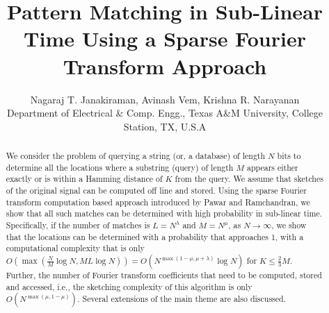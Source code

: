 \documentclass[journal,11pt,onecolumn]{IEEEtran}  %
\title{\LARGE \bf
Pattern Matching in Sub-Linear Time Using a Sparse Fourier Transform Approach
}
\author{Nagaraj T. Janakiraman, Avinash Vem, Krishna R. Narayanan \\
{Department of Electrical \& Comp. Engg., Texas A\&M University, College Station, TX, U.S.A}
}
\begin{document}
\maketitle
\thispagestyle{empty}
\pagestyle{empty}


\begin{abstract}
We consider the problem of querying a string (or, a database) of length $N$ bits to determine all the locations where a substring (query) of length $M$ appears either exactly or is within a Hamming distance of $K$ from the query. We assume that sketches of the original signal can be computed off line and stored. Using the sparse Fourier transform computation based approach introduced by Pawar and Ramchandran, we show that all such matches can be determined with high probability in sub-linear time. Specifically, if the number of matches is $L=N^\lambda$ and $M = N^\mu$, as $N \rightarrow \infty$, we show that the locations can be determined with a probability that approaches 1, with a computational complexity that is only $O\left(\max \left(\frac{N}{M} \log N, M L \log N \right) \right) = O\left(N^{\max(1-\mu,\mu+\lambda)} \log N \right)$ for $K \leq \frac{2}{3}M$. Further, the number of Fourier transform coefficients that need to be computed, stored and accessed, i.e., the sketching complexity of this algorithm is only $O\left( N^{\max(\mu,1-\mu)}\right)$. Several extensions of the main theme are also discussed.
\end{abstract}









\end{document}

